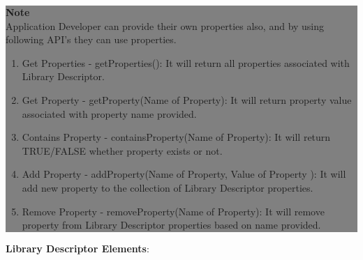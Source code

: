 			\begin{center}
				\colorbox{grey}{
					\parbox[t]{.8\linewidth}{
						\fontsize{11pt}{11pt}\selectfont %
						\vspace*{0.1cm} %
		
						\hfill \textbf{Note} \\

			
						Application Developer can provide their own properties also, and by using following API's they can use properties.

						\hfill 	
						\begin{enumerate}
							\item \small Get Properties - getProperties(): It will return all properties associated with Library Descriptor.
							\item \small Get Property - getProperty(Name of Property): It will return property value associated with property name provided.
							\item \small Contains Property - containsProperty(Name of Property): It will return TRUE/FALSE whether property exists or not.
							\item \small Add Property - addProperty(Name of Property, Value of Property ): It will add new property to the  collection of Library Descriptor properties.
							\item \small Remove Property - removeProperty(Name of Property): It will remove property from Library Descriptor properties based on name provided.
						\end{enumerate}

						\vspace*{0.0cm} %
				}
			}

		\end{center}


\newpage
\textbf{Library Descriptor Elements}: 

